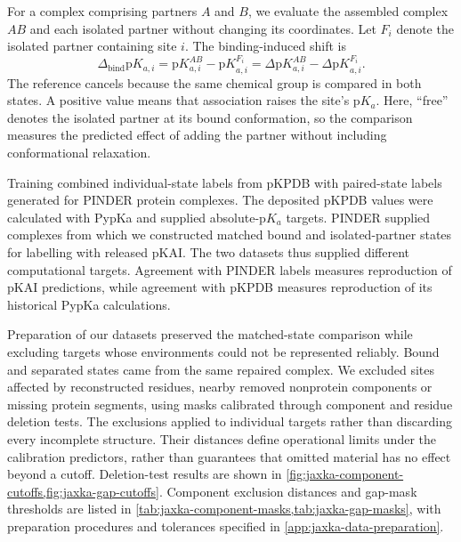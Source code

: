 For a complex comprising partners $A$ and $B$, we evaluate the assembled complex $AB$ and each isolated partner without changing its coordinates. Let $F_i$ denote the isolated partner containing site $i$. The binding-induced shift is
\begin{equation}
    \Delta_{\mathrm{bind}}\mathrm{p}K_{a,i}
    = \mathrm{p}K_{a,i}^{AB} - \mathrm{p}K_{a,i}^{F_i}
    = \Delta\mathrm{p}K_{a,i}^{AB} - \Delta\mathrm{p}K_{a,i}^{F_i}.
    \label{eq:jaxka-binding-shift}
\end{equation}
The reference cancels because the same chemical group is compared in both states. A positive value means that association raises the site's $\mathrm{p}K_a$. Here, ``free'' denotes the isolated partner at its bound conformation, so the comparison measures the predicted effect of adding the partner without including conformational relaxation.

Training combined individual-state labels from pKPDB with paired-state labels generated for PINDER protein complexes. The deposited pKPDB values were calculated with PypKa and supplied absolute-$\mathrm{p}K_a$ targets.\supercite{reisPKPDBProteinData2022} PINDER supplied complexes from which we constructed matched bound and isolated-partner states for labelling with released pKAI.\supercite{kovtunPINDERProteinInteraction2024} The two datasets thus supplied different computational targets. Agreement with PINDER labels measures reproduction of pKAI predictions, while agreement with pKPDB measures reproduction of its historical PypKa calculations. 

Preparation of our datasets preserved the matched-state comparison while excluding targets whose environments could not be represented reliably. Bound and separated states came from the same repaired complex. We excluded sites affected by reconstructed residues, nearby removed nonprotein components or missing protein segments, using masks calibrated through component and residue deletion tests. The exclusions applied to individual targets rather than discarding every incomplete structure. Their distances define operational limits under the calibration predictors, rather than guarantees that omitted material has no effect beyond a cutoff. Deletion-test results are shown in \cref{fig:jaxka-component-cutoffs,fig:jaxka-gap-cutoffs}. Component exclusion distances and gap-mask thresholds are listed in \cref{tab:jaxka-component-masks,tab:jaxka-gap-masks}, with preparation procedures and tolerances specified in \cref{app:jaxka-data-preparation}.

